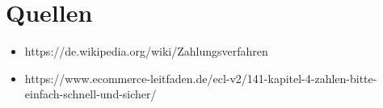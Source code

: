 \section{Quellen}

\begin{itemize}
	\item https://de.wikipedia.org/wiki/Zahlungsverfahren
	\item https://www.ecommerce-leitfaden.de/ecl-v2/141-kapitel-4-zahlen-bitte-einfach-schnell-und-sicher/
\end{itemize}